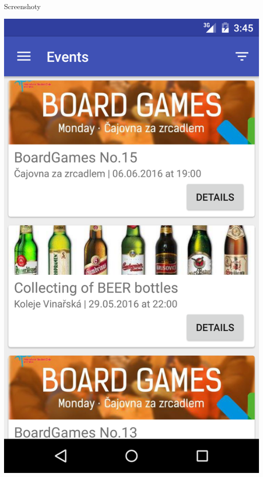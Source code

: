 \documentclass[pdf]{beamer}
\begin{document}
\begin{frame}{Screenshoty}
  \begin{center}
    \includegraphics[scale=0.1]{app-event}
  \end{center}
\end{frame}
\end{document}

